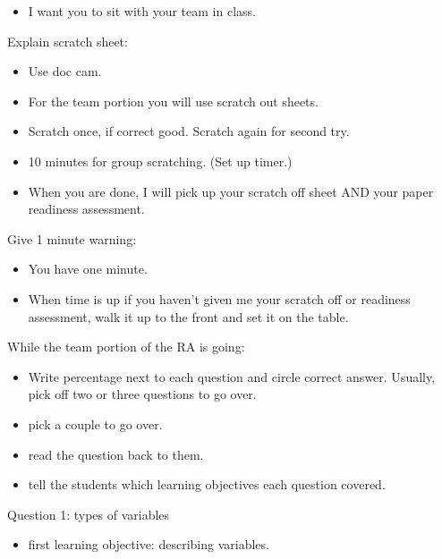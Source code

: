 \documentclass[11pt,containsverbatim,handout,xcolor=xelatex,dvipsnames,table]{beamer}
\begin{document}
\begin{frame}
{\begin{itemize}
\item I want you to sit with your team in class.

\end{itemize}

Explain scratch sheet:
\begin{itemize}
\item Use doc cam.

\item For the team portion you will use scratch out sheets.

\item Scratch once, if correct good.  Scratch again for second try.

\item 10 minutes for group scratching. (Set up timer.)

\item When you are done, I will pick up your scratch off sheet AND your paper readiness assessment.

\end{itemize}

Give 1 minute warning:
\begin{itemize}
\item You have one minute.

\item When time is up if you haven't given me your scratch off or readiness assessment, walk it up to the front and set it on the table.

\end{itemize}

While the team portion of the RA is going:
\begin{itemize}

\item Write percentage next to each question and circle correct answer.  Usually, pick off two or three questions to go over.

\item pick a couple to go over.

\item read the question back to them.

\item tell the students which learning objectives each question covered.

\end{itemize}

Question 1: types of variables
\begin{itemize}
\item first learning objective: describing variables.


\end{itemize}}
\end{frame}
\end{document}
